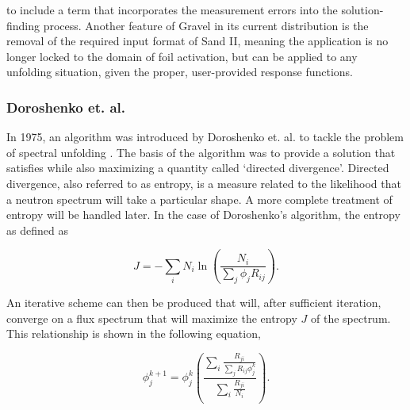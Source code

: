 \noindent
to include a term that incorporates the measurement errors into the solution-finding process.
Another feature of Gravel in its current distribution is the removal of the required input format of Sand II, meaning the application is no longer locked to the domain of foil activation, but can be applied to any unfolding situation, given the proper, user-provided response functions.



\subsubsection{Doroshenko et. al.}

In 1975, an algorithm was introduced by Doroshenko et. al. to tackle the problem of spectral unfolding \cite{doroshenko1977new}.
The basis of the algorithm was to provide a solution that satisfies  while also maximizing a quantity called `directed divergence'.
Directed divergence, also referred to as entropy, is a measure related to the likelihood that a neutron spectrum will take a particular shape.
A more complete treatment of entropy will be handled later.
In the case of Doroshenko's algorithm, the entropy as defined as

\begin{equation}
\label{eqn:doroshenko-entropy}
J = - \sum_i N_i \ln(\frac{N_i}{\sum_j \phi_j R_{ij}}) .
\end{equation}

An iterative scheme can then be produced that will, after sufficient iteration, converge on a flux spectrum that will maximize the entropy $J$ of the spectrum.
This relationship is shown in the following equation,

\begin{equation}
\label{eqn:doroshenko}
\phi_j^{k + 1} = \phi_j^{k} (\frac{\sum_i \frac{R_{ji}}{\sum_j R_{ij} \phi_j^k}}{\sum_i \frac{R_{ji}}{N_i}}) .
\end{equation}

